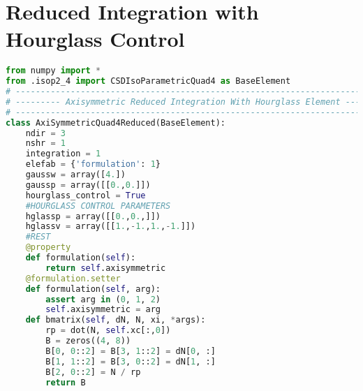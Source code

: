 \documentclass[10pt,letterpaper]{report}
\numberwithin{equation}{chapter}
\begin{document}
%
%


\section{Reduced Integration with Hourglass Control}

\begin{lstlisting}[language=Python]
from numpy import *
from .isop2_4 import CSDIsoParametricQuad4 as BaseElement
# --------------------------------------------------------------------------- #
# --------- Axisymmetric Reduced Integration With Hourglass Element --------- #
# --------------------------------------------------------------------------- #
class AxiSymmetricQuad4Reduced(BaseElement):
    ndir = 3
    nshr = 1
    integration = 1
    elefab = {'formulation': 1}
    gaussw = array([4.])
    gaussp = array([[0.,0.]])
    hourglass_control = True
    #HOURGLASS CONTROL PARAMETERS
    hglassp = array([[0.,0.,]])
    hglassv = array([[1.,-1.,1.,-1.]])
    #REST
    @property
    def formulation(self):
        return self.axisymmetric
    @formulation.setter
    def formulation(self, arg):
        assert arg in (0, 1, 2)
        self.axisymmetric = arg
    def bmatrix(self, dN, N, xi, *args):
        rp = dot(N, self.xc[:,0])
        B = zeros((4, 8))
        B[0, 0::2] = B[3, 1::2] = dN[0, :]
        B[1, 1::2] = B[3, 0::2] = dN[1, :]
        B[2, 0::2] = N / rp
        return B
\end{lstlisting}
\end{document}
